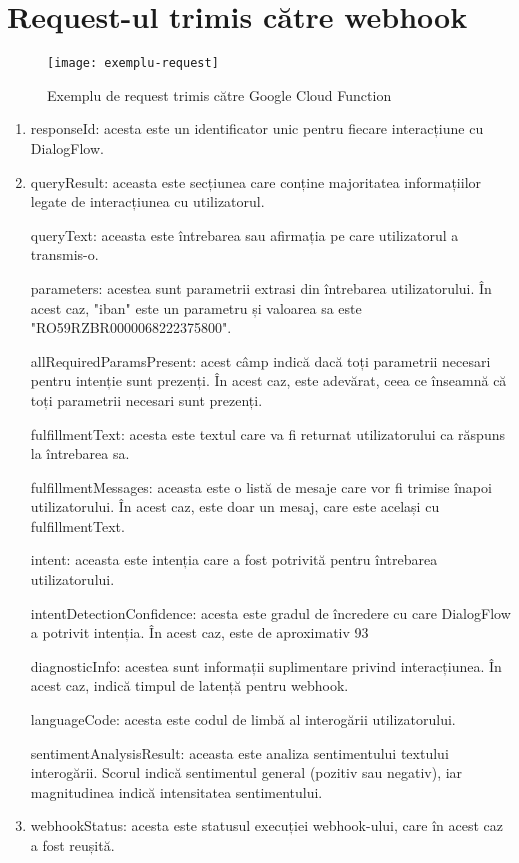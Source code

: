 \chapter{Request-ul trimis către webhook}

\label{annex:request}

\begin{figure}[h]
    \centering
    \texttt{[image: exemplu-request]}
    \caption{Exemplu de request trimis către Google Cloud Function}
    \label{fig:exemplu-request}
\end{figure}

\cleardoublepage

\begin{enumerate}
    \item responseId: acesta este un identificator unic pentru fiecare interacțiune cu DialogFlow.

    \item queryResult: aceasta este secțiunea care conține majoritatea informațiilor legate de interacțiunea cu utilizatorul.
    
    \subitem queryText: aceasta este întrebarea sau afirmația pe care utilizatorul a transmis-o.
    
    \subitem parameters: acestea sunt parametrii extrasi din întrebarea utilizatorului. În acest caz, "iban" este un parametru și valoarea sa este "RO59RZBR0000068222375800".
    
    \subitem allRequiredParamsPresent: acest câmp indică dacă toți parametrii necesari pentru intenție sunt prezenți. În acest caz, este adevărat, ceea ce înseamnă că toți parametrii necesari sunt prezenți.
    
    \subitem fulfillmentText: acesta este textul care va fi returnat utilizatorului ca răspuns la întrebarea sa.
    
    \subitem fulfillmentMessages: aceasta este o listă de mesaje care vor fi trimise înapoi utilizatorului. În acest caz, este doar un mesaj, care este același cu fulfillmentText.
    
    \subitem intent: aceasta este intenția care a fost potrivită pentru întrebarea utilizatorului.
    
    \subitem intentDetectionConfidence: acesta este gradul de încredere cu care DialogFlow a potrivit intenția. În acest caz, este de aproximativ 93%
    
    \subitem diagnosticInfo: acestea sunt informații suplimentare privind interacțiunea. În acest caz, indică timpul de latență pentru webhook.
    
    \subitem languageCode: acesta este codul de limbă al interogării utilizatorului.
    
    \subitem sentimentAnalysisResult: aceasta este analiza sentimentului textului interogării. Scorul indică sentimentul general (pozitiv sau negativ), iar magnitudinea indică intensitatea sentimentului.
    
    \item webhookStatus: acesta este statusul execuției webhook-ului, care în acest caz a fost reușită.
\end{enumerate}